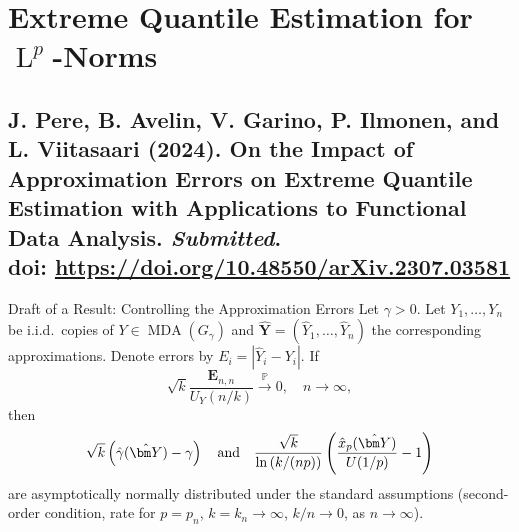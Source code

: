 \documentclass[11pt, aspectratio=169]{beamer}
\DeclareMathOperator{\mda}{MDA}
\DeclareMathOperator{\lp}{L}
\begin{document}

\section{Extreme Quantile Estimation for $\lp^p$-Norms}


\subsection{J. Pere, B. Avelin, V. Garino, P. Ilmonen, and L. Viitasaari (2024).
On the Impact of Approximation Errors on Extreme Quantile Estimation with
Applications to Functional Data Analysis. \emph{Submitted}. \\
doi: \textcolor{hyscience}{\url{https://doi.org/10.48550/arXiv.2307.03581}}}


\begin{frame}{Draft of a Result: Controlling the Approximation Errors}
  Let $\gamma > 0$. Let $Y_1, \ldots, Y_n$ be i.i.d.\ copies of
  $Y\in\mda\left(G_\gamma\right)$ and $\hat{\bm Y} = (\hat Y_1, \ldots, \hat
  Y_n)$ the corresponding approximations. Denote errors by $E_i = \left|\hat Y_i
  - Y_i\right|$. If
  \begin{equation*}
    \sqrt{k}\frac{\bm E_{n,n}}{U_Y\left(n/k\right)}\stackrel{\mathbb{P}}{\to}0,
    \quad n\to\infty,
  \end{equation*}
  then
  \begin{equation*}
    \sqrt{k}\left(\hat\gamma(\hat{\bm Y}) - \gamma\right)
    \quad\textnormal{and}\quad
    \frac{\sqrt{k}}{\ln\left(k/(np)\right)}\left(\frac{\hat x_p(\hat{\bm Y})}
    {U(1/p)} - 1\right)
  \end{equation*}
  are asymptotically normally distributed under the standard assumptions
  (second-order condition, rate for $p = p_n$, $k = k_n\to\infty$, $k/n\to 0$,
  as $n\to\infty$).
\end{frame}

\end{document}

